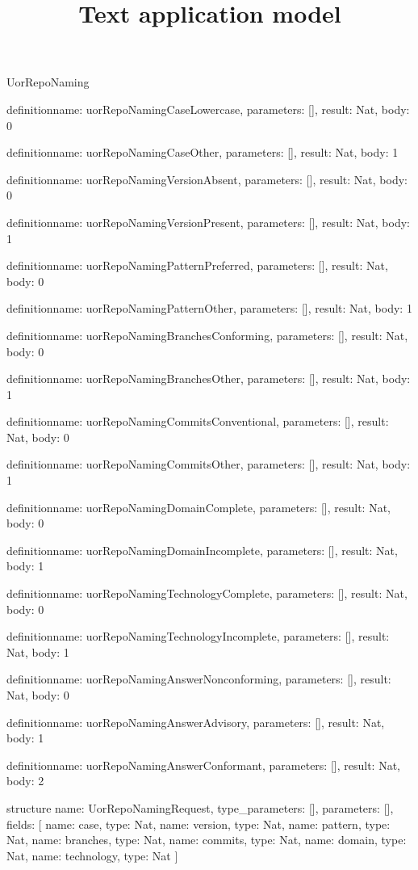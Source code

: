 \begin{lexlean}{UorRepoNaming}
\title{Text application model}
\begin{semanticmodule}
definition{name: uorRepoNamingCaseLowercase, parameters: [], result: Nat, body: 0}

definition{name: uorRepoNamingCaseOther, parameters: [], result: Nat, body: 1}

definition{name: uorRepoNamingVersionAbsent, parameters: [], result: Nat, body: 0}

definition{name: uorRepoNamingVersionPresent, parameters: [], result: Nat, body: 1}

definition{name: uorRepoNamingPatternPreferred, parameters: [], result: Nat, body: 0}

definition{name: uorRepoNamingPatternOther, parameters: [], result: Nat, body: 1}

definition{name: uorRepoNamingBranchesConforming, parameters: [], result: Nat, body: 0}

definition{name: uorRepoNamingBranchesOther, parameters: [], result: Nat, body: 1}

definition{name: uorRepoNamingCommitsConventional, parameters: [], result: Nat, body: 0}

definition{name: uorRepoNamingCommitsOther, parameters: [], result: Nat, body: 1}

definition{name: uorRepoNamingDomainComplete, parameters: [], result: Nat, body: 0}

definition{name: uorRepoNamingDomainIncomplete, parameters: [], result: Nat, body: 1}

definition{name: uorRepoNamingTechnologyComplete, parameters: [], result: Nat, body: 0}

definition{name: uorRepoNamingTechnologyIncomplete, parameters: [], result: Nat, body: 1}

definition{name: uorRepoNamingAnswerNonconforming, parameters: [], result: Nat, body: 0}

definition{name: uorRepoNamingAnswerAdvisory, parameters: [], result: Nat, body: 1}

definition{name: uorRepoNamingAnswerConformant, parameters: [], result: Nat, body: 2}

structure{
  name: UorRepoNamingRequest,
  type_parameters: [],
  parameters: [],
  fields: [
    {name: case, type: Nat},
    {name: version, type: Nat},
    {name: pattern, type: Nat},
    {name: branches, type: Nat},
    {name: commits, type: Nat},
    {name: domain, type: Nat},
    {name: technology, type: Nat}
  ]
}


\end{semanticmodule}
\end{lexlean}
